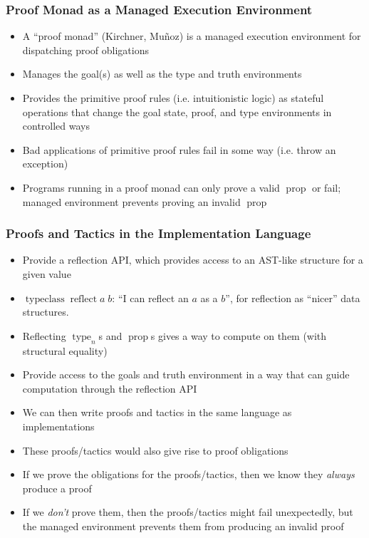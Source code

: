 \documentclass{beamer}
\newcommand{\typekw}[1]{\ensuremath{{\operatorname{type}}_{#1}}}
\newcommand{\propkw}{\ensuremath{\operatorname{prop}}}
\begin{document}
\begin{frame}
  \frametitle{Proof Monad as a Managed Execution Environment}
  \begin{itemize}
    \item A ``proof monad'' (Kirchner, Mu\~{n}oz) is a managed
      execution environment for dispatching proof obligations
    \item Manages the goal(s) as well as the type and truth
      environments
    \item Provides the primitive proof rules (i.e. intuitionistic
      logic) as stateful operations that change the goal state, proof,
      and type environments in controlled ways
    \item Bad applications of primitive proof rules fail in some way
      (i.e. throw an exception)
    \item Programs running in a proof monad can only prove a valid
      \propkw{} or fail; managed environment prevents proving an
      invalid \propkw{}
  \end{itemize}
\end{frame}

\begin{frame}
  \frametitle{Proofs and Tactics in the Implementation Language}
  \begin{itemize}
    \item Provide a reflection API, which provides access to an
      AST-like structure for a given value
    \item $\operatorname{typeclass} \operatorname{reflect} a\; b$: ``I can
      reflect an $a$ as a $b$'', for reflection as ``nicer'' data
      structures.
    \item Reflecting \typekw{n}s and \propkw{}s gives a way to compute
      on them (with structural equality)
    \item Provide access to the goals and truth environment in a way
      that can guide computation through the reflection API
    \item We can then write proofs and tactics in the same language as
      implementations
    \item These proofs/tactics would also give rise to proof
      obligations
    \item If we prove the obligations for the proofs/tactics, then we
      know they \emph{always} produce a proof
    \item If we \emph{don't} prove them, then the proofs/tactics might
      fail unexpectedly, but the managed environment prevents them
      from producing an invalid proof
  \end{itemize}
\end{frame}
\end{document}

